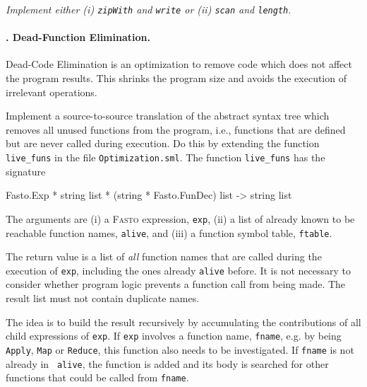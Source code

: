 \documentclass[a4paper,11pt]{article}
\newcommand{\fasto}{\textsc{Fasto}\xspace}
\begin{document}
{\em Implement either (i) {\tt zipWith} and {\tt write} or (ii)
{\tt scan} and {\tt length}}.

\paragraph{\nexttask. Dead-Function Elimination.}

Dead-Code Elimination is an optimization to remove code which does not affect
the program results. This shrinks the program size and avoids the execution of
irrelevant operations.

Implement a source-to-source translation of the abstract syntax tree which
removes all unused functions from the program, i.e., functions that are defined
but are never called during execution. Do this by extending the function {\tt
live\_funs} in the file {\tt Optimization.sml}. The function {\tt live\_funs}
has the signature

%
\begin{fancycode}[fontsize=\small]
Fasto.Exp * string list * (string * Fasto.FunDec) list -> string list
\end{fancycode}

The arguments are
(i) a \fasto expression, {\tt exp},
(ii) a list of already known to be reachable function names, {\tt alive}, and
(iii) a function symbol table, {\tt ftable}.

The return value is a list of {\em all} function names that are called during
the execution of {\tt exp}, including the ones already {\tt alive} before. It
is not necessary to consider whether program logic prevents a function call
from being made. The result list must not contain duplicate names.

The idea is to build the result recursively by accumulating the contributions
of all child expressions of {\tt exp}.  If {\tt exp} involves a function name,
{\tt fname}, e.g. by being {\tt Apply}, {\tt Map} or {\tt Reduce}, this
function also needs to be investigated. If {\tt fname} is not already in {\tt
alive}, the function is added and its body is searched for other functions that
could be called from {\tt fname}.
\end{document}
